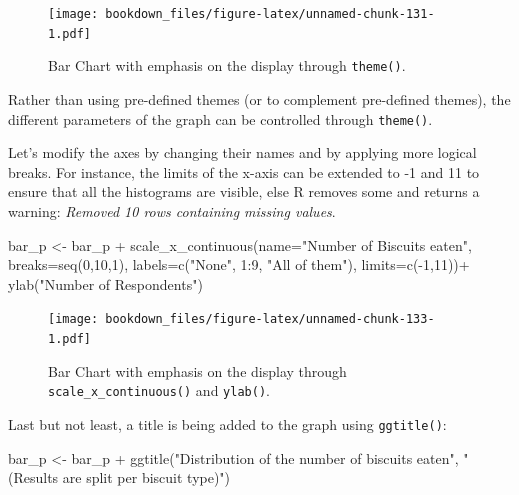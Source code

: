\documentclass[
]{krantz}
\makeatletter
\newenvironment{Shaded}{\begin{snugshade}}{\end{snugshade}}
\newcommand{\AttributeTok}[1]{\textcolor[rgb]{0.61,0.61,0.61}{#1}}
\newcommand{\DecValTok}[1]{\textcolor[rgb]{0.06,0.06,0.06}{#1}}
\newcommand{\FunctionTok}[1]{\textcolor[rgb]{0,0,0}{#1}}
\newcommand{\NormalTok}[1]{#1}
\newcommand{\OtherTok}[1]{\textcolor[rgb]{0.37,0.37,0.37}{#1}}
\newcommand{\SpecialCharTok}[1]{\textcolor[rgb]{0,0,0}{#1}}
\newcommand{\StringTok}[1]{\textcolor[rgb]{0.5,0.5,0.5}{#1}}
\newenvironment{kframe}{%
\medskip{}
\setlength{\fboxsep}{.8em}
 \def\at@end@of@kframe{}%
 \ifinner\ifhmode%
  \def\at@end@of@kframe{\end{minipage}}%
  \begin{minipage}{\columnwidth}%
 \fi\fi%
 \def\FrameCommand##1{\hskip\@totalleftmargin \hskip-\fboxsep
 \colorbox{shadecolor}{##1}\hskip-\fboxsep
     \hskip-\linewidth \hskip-\@totalleftmargin \hskip\columnwidth}%
 \MakeFramed {\advance\hsize-\width
   \@totalleftmargin\z@ \linewidth\hsize
   \@setminipage}}%
 {\par\unskip\endMakeFramed%
 \at@end@of@kframe}
\renewenvironment{Shaded}{\begin{kframe}}{\end{kframe}}
\makeatother
\begin{document}
\begin{figure}
\centering
\texttt{[image: bookdown\_files/figure-latex/unnamed-chunk-131-1.pdf]}
\caption{\label{fig:unnamed-chunk-131}Bar Chart with emphasis on the display through \texttt{theme()}.}
\end{figure}

Rather than using pre-defined themes (or to complement pre-defined themes), the different parameters of the graph can be controlled through \texttt{theme()}.

Let's modify the axes by changing their names and by applying more logical breaks. For instance, the limits of the x-axis can be extended to -1 and 11 to ensure that all the histograms are visible, else R removes some and returns a warning: \emph{Removed 10 rows containing missing values}.

\begin{Shaded}
\begin{Highlighting}[]
\NormalTok{bar\_p }\OtherTok{\textless{}{-}}\NormalTok{ bar\_p }\SpecialCharTok{+}
  \FunctionTok{scale\_x\_continuous}\NormalTok{(}\AttributeTok{name=}\StringTok{"Number of Biscuits eaten"}\NormalTok{, }
                     \AttributeTok{breaks=}\FunctionTok{seq}\NormalTok{(}\DecValTok{0}\NormalTok{,}\DecValTok{10}\NormalTok{,}\DecValTok{1}\NormalTok{), }
                     \AttributeTok{labels=}\FunctionTok{c}\NormalTok{(}\StringTok{"None"}\NormalTok{, }\DecValTok{1}\SpecialCharTok{:}\DecValTok{9}\NormalTok{, }\StringTok{"All of them"}\NormalTok{), }
                     \AttributeTok{limits=}\FunctionTok{c}\NormalTok{(}\SpecialCharTok{{-}}\DecValTok{1}\NormalTok{,}\DecValTok{11}\NormalTok{))}\SpecialCharTok{+}
  \FunctionTok{ylab}\NormalTok{(}\StringTok{"Number of Respondents"}\NormalTok{)}
\end{Highlighting}
\end{Shaded}

\begin{figure}
\centering
\texttt{[image: bookdown\_files/figure-latex/unnamed-chunk-133-1.pdf]}
\caption{\label{fig:unnamed-chunk-133}Bar Chart with emphasis on the display through \texttt{scale\_x\_continuous()} and \texttt{ylab()}.}
\end{figure}

Last but not least, a title is being added to the graph using \texttt{ggtitle()}:

\begin{Shaded}
\begin{Highlighting}[]
\NormalTok{bar\_p }\OtherTok{\textless{}{-}}\NormalTok{ bar\_p }\SpecialCharTok{+}
  \FunctionTok{ggtitle}\NormalTok{(}\StringTok{"Distribution of the number of biscuits eaten"}\NormalTok{,}
          \StringTok{"(Results are split per biscuit type)"}\NormalTok{)}
\end{Highlighting}
\end{Shaded}
\end{document}
